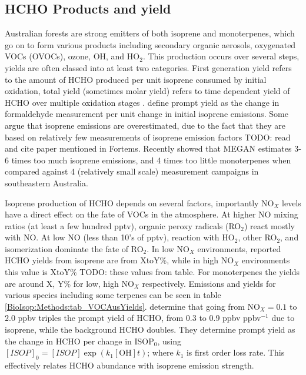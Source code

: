   \subsection{HCHO Products and yield}
    \label{BioIsop:Methods:HCHOYield}
    Australian forests are strong emitters of both isoprene and monoterpenes, which go on to form various products including secondary organic aerosols, oxygenated VOCs (OVOCs), ozone, OH, and HO$_2$.
    This production occurs over several steps, yields are often classed into at least two categories.
    First generation yield refers to the amount of HCHO produced per unit isoprene consumed by initial oxidation, total yield (sometimes molar yield) refers to time dependent yield of HCHO over multiple oxidation stages \citep{Wolfe2016}.
    \citet{Wolfe2016} define prompt yield as the change in formaldehyde measurement per unit change in initial isoprene emissions.
    Some argue that isoprene emissions are overestimated, due to the fact that they are based on relatively few measurements of isoprene emission factors \citep{Winters2009, FortemsCheiney2012} TODO: read and cite paper mentioned in Fortems.
    Recently \cite{Emmerson2017} showed that MEGAN estimates 3-6 times too much isoprene emissions, and 4 times too little monoterpenes when compared against 4 (relatively small scale) measurement campaigns in southeastern Australia.
    
    Isoprene production of HCHO depends on several factors, importantly NO$_X$ levels have a direct effect on the fate of VOCs in the atmosphere.
    At higher NO mixing ratios (at least a few hundred pptv), organic peroxy radicals (RO$_2$) react mostly with NO. 
    At low NO (less than 10's of pptv), reaction with HO$_2$, other RO$_2$, and isomerization dominate the fate of RO$_2$.
    In low NO$_X$ environments, reported HCHO yields from isoprene are from XtoY\%, while in high NO$_X$ environments this value is XtoY\% TODO: these values from table.
    For monoterpenes the yields are around X, Y\% for low, high NO$_X$ respectively.
    Emissions and yields for various species including some terpenes can be seen in table \ref{BioIsop:Methods:tab_VOCAusYields}.
    \citet{Wolfe2016} determine that going from NO$_X = 0.1$ to $2.0$ ppbv triples the prompt yield of HCHO, from 0.3 to 0.9 ppbv ppbv$^{-1}$ due to isoprene, while the background HCHO doubles.
    They determine prompt yield as the change in HCHO per change in ISOP$_0$, using $[ISOP]_0=[ISOP]\exp(k_1[\mathrm{OH}]t)$; where $k_1$ is first order loss rate.
    This effectively relates HCHO abundance with isoprene emission strength.
    
